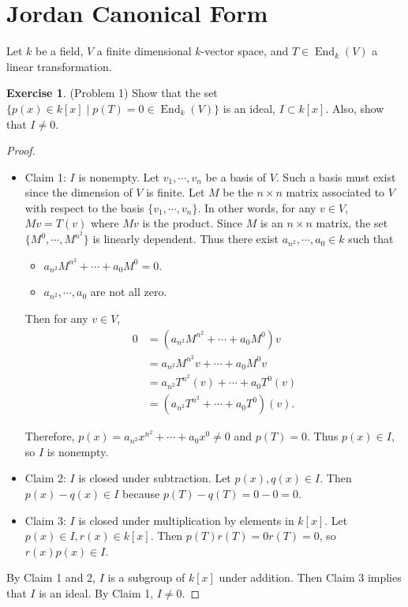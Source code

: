 \documentclass[12pt, psamsfonts]{amsart}
\theoremstyle{definition}
\newtheorem*{exer}{Exercise}
\theoremstyle{remark}
\DeclareMathOperator{\End}{End}
\numberwithin{equation}{section}
\begin{document}
\section{Jordan Canonical Form}

Let $k$ be a field, $V$ a finite dimensional $k$-vector space, and $T \in \End_k(V)$ a linear transformation.

\begin{exer}{(Problem 1)}
  Show that the set $\{ p(x) \in k[x] \mid p(T) = 0 \in \End_k(V) \}$ is an ideal, $I \subset k[x]$.
  Also, show that $I \ne 0$.
\end{exer}

\begin{proof}
  $ $
  \begin{itemize}
    \item
      Claim 1: $I$ is nonempty.
      Let $v_1, \cdots, v_n$ be a basis of $V$.
      Such a basis must exist since the dimension of $V$ is finite.
      Let $M$ be the $n \times n$ matrix associated to $V$ with respect to the basis $\{ v_1, \cdots, v_n \}$.
      In other words, for any $v \in V$, $Mv = T(v)$ where $Mv$ is the product.
      Since $M$ is an $n \times n$ matrix, the set $\{ M^0, \cdots, M^{n^2} \}$ is linearly dependent.
      Thus there exist $a_{n^2}, \cdots, a_0 \in k$ such that
      \begin{itemize}
        \item
          $a_{n^2}M^{n^2} + \cdots + a_0M^0 = 0$.
        \item
          $a_{n^2}, \cdots, a_0$ are not all zero.
      \end{itemize}
      Then for any $v \in V$,
      \begin{align*}
        0 &= (a_{n^2}M^{n^2} + \cdots + a_0M^0)v \\
          &= a_{n^2}M^{n^2}v + \cdots + a_0M^0v \\
          &= a_{n^2}T^{n^2}(v) + \cdots + a_0T^0(v) \\
          &= (a_{n^2}T^{n^2} + \cdots + a_0T^0)(v).
      \end{align*}

      Therefore, $p(x) = a_{n^2}x^{n^2} + \cdots + a_0x^0 \ne 0$ and $p(T) = 0$.
      Thus $p(x) \in I$, so $I$ is nonempty.
    \item
      Claim 2: $I$ is closed under subtraction.
      Let $p(x), q(x) \in I$.
      Then $p(x) - q(x) \in I$ because $p(T) - q(T) = 0 - 0 = 0$.
    \item
      Claim 3: $I$ is closed under multiplication by elements in $k[x]$.
      Let $p(x) \in I, r(x) \in k[x]$.
      Then $p(T)r(T) = 0r(T) = 0$, so $r(x)p(x) \in I$.
  \end{itemize}
  By Claim 1 and 2, $I$ is a subgroup of $k[x]$ under addition.
  Then Claim 3 implies that $I$ is an ideal.
  By Claim 1, $I \ne 0$.
\end{proof}
\end{document}
